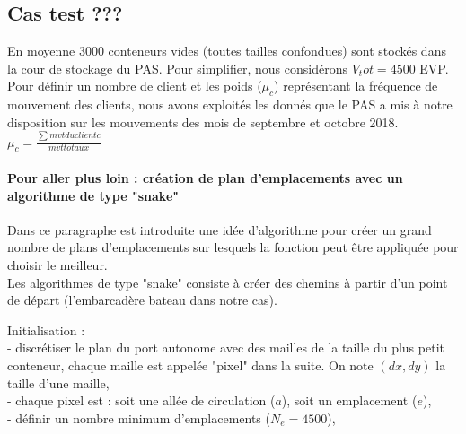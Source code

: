 \documentclass{article}
\begin{document}
\subsection{Cas test ???}
En moyenne $3000$ conteneurs vides (toutes tailles confondues) sont stockés dans la cour de stockage du PAS. Pour simplifier, nous considérons  $V_tot=4500$ EVP. \\

Pour définir un nombre de client et les poids ($\mu_c$)  représentant la fréquence de mouvement des clients, nous avons exploités les donnés que le PAS a mis à notre disposition sur les mouvements des mois de septembre et octobre 2018. 
$
\mu_c = \frac{\sum_{} mvt du client c}{mvt totaux} 
$



\paragraph{Pour aller plus loin : création de plan d'emplacements avec un algorithme de type "snake"} %

Dans ce paragraphe est introduite une idée d'algorithme pour créer un grand nombre de plans d'emplacements sur lesquels la fonction peut être appliquée pour choisir le meilleur. \\

Les algorithmes de type "snake" consiste à créer des chemins à partir d'un point de départ (l'embarcadère bateau dans notre cas). %

Initialisation : \\
- discrétiser le plan du port autonome avec des mailles de la taille du plus petit conteneur, chaque maille est appelée "pixel" dans la suite. On note $(dx,dy)$ la taille d'une maille, \\
- chaque pixel est : soit une allée de circulation ($a$), soit un emplacement ($e$), \\
- définir un nombre minimum d'emplacements ($N_e=4500$), \\
\end{document}
